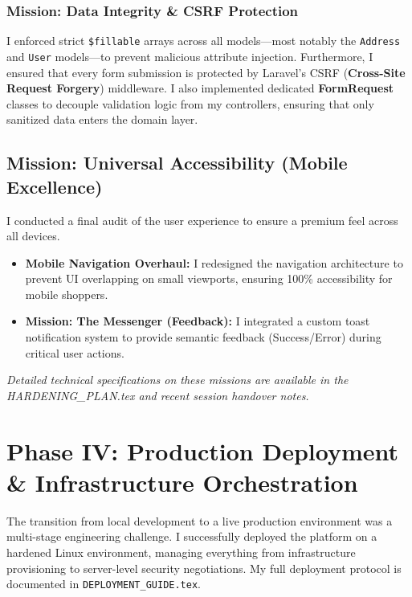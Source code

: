 \documentclass[12pt,a4paper]{article}
\begin{document}
\subsubsection{Mission: Data Integrity \& CSRF Protection}
I enforced strict \texttt{\$fillable} arrays across all models—most notably the \texttt{Address} and \texttt{User} models—to prevent malicious attribute injection. Furthermore, I ensured that every form submission is protected by Laravel's CSRF (\textbf{Cross-Site Request Forgery}) middleware. I also implemented dedicated \textbf{FormRequest} classes to decouple validation logic from my controllers, ensuring that only sanitized data enters the domain layer.

\subsection{Mission: Universal Accessibility (Mobile Excellence)}
I conducted a final audit of the user experience to ensure a premium feel across all devices.
\begin{itemize}
    \item \textbf{Mobile Navigation Overhaul:} I redesigned the navigation architecture to prevent UI overlapping on small viewports, ensuring 100\% accessibility for mobile shoppers.
    \item \textbf{Mission: The Messenger (Feedback):} I integrated a custom toast notification system to provide semantic feedback (Success/Error) during critical user actions.
\end{itemize}

\vfill
\begin{center}
    \textit{Detailed technical specifications on these missions are available in the HARDENING\_PLAN.tex and recent session handover notes.}
\end{center}


\newpage
\section{Phase IV: Production Deployment \& Infrastructure Orchestration}

The transition from local development to a live production environment was a multi-stage engineering challenge. I successfully deployed the platform on a hardened Linux environment, managing everything from infrastructure provisioning to server-level security negotiations. My full deployment protocol is documented in \texttt{DEPLOYMENT\_GUIDE.tex}.
\end{document}
